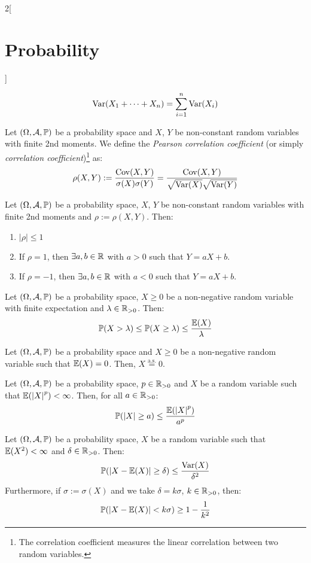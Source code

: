 \documentclass[../../../main.tex]{subfiles}
\begin{document}
\begin{multicols}{2}[\section{Probability}]
\begin{corollary}
    $$\operatorname{Var}(X_1+\cdots+X_n)=\sum_{i=1}^n\operatorname{Var}(X_i)$$
  \end{corollary}
  \begin{definition}
    Let $(\Omega,\mathcal{A},\mathbb{P})$ be a probability space and $X$, $Y$ be non-constant random variables with finite 2nd moments. We define the \emph{Pearson correlation coefficient} (or simply \emph{correlation coefficient})\footnote{The correlation coefficient measures the linear correlation between two random variables.} as: $$\rho(X,Y):=\frac{\operatorname{Cov}(X,Y)}{\sigma(X)\sigma(Y)}=\frac{\operatorname{Cov}(X,Y)}{\sqrt{\operatorname{Var}(X)}\sqrt{\operatorname{Var}(Y)}}$$
  \end{definition}
  \begin{proposition}
    Let $(\Omega,\mathcal{A},\mathbb{P})$ be a probability space, $X$, $Y$ be non-constant random variables with finite 2nd moments and $\rho:=\rho(X,Y)$. Then:
    \begin{enumerate}
      \item $|\rho|\leq 1$
      \item If $\rho=1$, then $\exists a,b\in\mathbb{R}$ with $a>0$ such that $Y=aX+b$.
      \item If $\rho=-1$, then $\exists a,b\in\mathbb{R}$ with $a<0$ such that $Y=aX+b$.
    \end{enumerate}
  \end{proposition}
  \begin{theorem}
    Let $(\Omega,\mathcal{A},\mathbb{P})$ be a probability space, $X\geq 0$ be a non-negative random variable with finite expectation and $\lambda\in\mathbb{R}_{>0}$. Then:
    $$\mathbb{P}(X>\lambda)\leq \mathbb{P}(X\geq \lambda)\leq \frac{\mathbb{E}(X)}{\lambda}$$
  \end{theorem}
  \begin{corollary}
    Let $(\Omega,\mathcal{A},\mathbb{P})$ be a probability space and $X\geq 0$ be a non-negative random variable such that $\mathbb{E}(X)=0$. Then, $X\overset{\text{a.s.}}{=}0$.
  \end{corollary}
  \begin{corollary}
    Let $(\Omega,\mathcal{A},\mathbb{P})$ be a probability space, $p\in\mathbb{R}_{>0}$ and $X$ be a random variable such that $\mathbb{E}({|X|}^p)<\infty$. Then, for all $a\in\mathbb{R}_{>0}$: $$\mathbb{P}(|X|\geq a)\leq \frac{\mathbb{E}({|X|}^p)}{a^p}$$
  \end{corollary}
  \begin{corollary}
    Let $(\Omega,\mathcal{A},\mathbb{P})$ be a probability space, $X$ be a random variable such that $\mathbb{E}(X^2)<\infty$ and $\delta\in\mathbb{R}_{>0}$. Then: $$\mathbb{P}(|X-\mathbb{E}(X)|\geq\delta)\leq\frac{\operatorname{Var}(X)}{\delta^2}$$ Furthermore, if $\sigma:=\sigma(X)$ and we take $\delta=k\sigma$, $k\in\mathbb{R}_{>0}$, then: $$\mathbb{P}(|X-\mathbb{E}(X)|<k\sigma)\geq1-\frac{1}{k^2}$$

\end{corollary}
\end{multicols}
\end{document}
